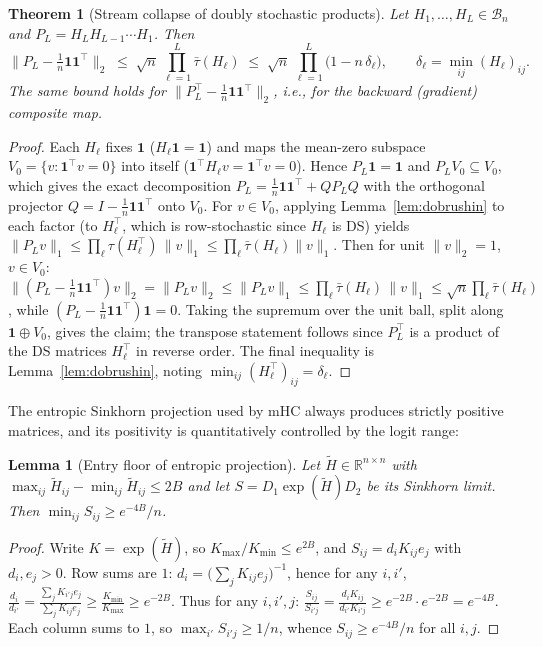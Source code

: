 \documentclass[11pt]{article}
\newtheorem{theorem}{Theorem}
\newtheorem{lemma}{Lemma}
\newcommand{\R}{\mathbb{R}}
\newcommand{\ones}{\mathbf{1}}
\newcommand{\J}{\tfrac{1}{n}\ones\ones^{\!\top}}
\begin{document}
\begin{theorem}[Stream collapse of doubly stochastic products]
\label{thm:collapse}
Let $H_1,\dots,H_L\in\mathcal{B}_n$ and $P_L=H_L H_{L-1}\cdots H_1$. Then
\begin{equation}
\Big\|P_L-\J\Big\|_2\;\le\;\sqrt{n}\,\prod_{\ell=1}^{L}\bar\tau(H_\ell)\;\le\;\sqrt{n}\,\prod_{\ell=1}^{L}\big(1-n\,\delta_\ell\big),
\qquad \delta_\ell=\min_{ij}(H_\ell)_{ij}.
\end{equation}
The same bound holds for $\|P_L^{\!\top}-\J\|_2$, i.e., for the backward (gradient) composite map.
\end{theorem}
\begin{proof}
Each $H_\ell$ fixes $\ones$ ($H_\ell\ones=\ones$) and maps the mean-zero subspace $V_0=\{v:\ones^{\!\top}v=0\}$ into itself ($\ones^{\!\top}H_\ell v=\ones^{\!\top}v=0$). Hence $P_L\ones=\ones$ and $P_L V_0\subseteq V_0$, which gives the exact decomposition $P_L=\J+Q P_L Q$ with the orthogonal projector $Q=I-\J$ onto $V_0$. For $v\in V_0$, applying Lemma~\ref{lem:dobrushin} to each factor (to $H_\ell^{\!\top}$, which is row-stochastic since $H_\ell$ is DS) yields
$\|P_Lv\|_1\le\prod_\ell\tau(H_\ell^{\!\top})\,\|v\|_1\le\prod_\ell\bar\tau(H_\ell)\|v\|_1$.
Then for unit $\|v\|_2=1$, $v\in V_0$:
$\|(P_L-\J)v\|_2=\|P_Lv\|_2\le\|P_Lv\|_1\le\prod_\ell\bar\tau(H_\ell)\,\|v\|_1\le\sqrt{n}\prod_\ell\bar\tau(H_\ell)$,
while $(P_L-\J)\ones=0$. Taking the supremum over the unit ball, split along $\ones\oplus V_0$, gives the claim; the transpose statement follows since $P_L^{\!\top}$ is a product of the DS matrices $H_\ell^{\!\top}$ in reverse order. The final inequality is Lemma~\ref{lem:dobrushin}, noting $\min_{ij}(H_\ell^{\!\top})_{ij}=\delta_\ell$.
\end{proof}

The entropic Sinkhorn projection used by mHC always produces strictly positive matrices, and its positivity is quantitatively controlled by the logit range:

\begin{lemma}[Entry floor of entropic projection]
\label{lem:floor}
Let $\tilde H\in\R^{n\times n}$ with $\max_{ij}\tilde H_{ij}-\min_{ij}\tilde H_{ij}\le 2B$ and let $S=D_1\exp(\tilde H)D_2$ be its Sinkhorn limit. Then $\min_{ij}S_{ij}\ge e^{-4B}/n$.
\end{lemma}
\begin{proof}
Write $K=\exp(\tilde H)$, so $K_{\max}/K_{\min}\le e^{2B}$, and $S_{ij}=d_i K_{ij}e_j$ with $d_i,e_j>0$. Row sums are $1$: $d_i=\big(\sum_j K_{ij}e_j\big)^{-1}$, hence for any $i,i'$,
$\frac{d_i}{d_{i'}}=\frac{\sum_j K_{i'j}e_j}{\sum_j K_{ij}e_j}\ge\frac{K_{\min}}{K_{\max}}\ge e^{-2B}$.
Thus for any $i,i',j$: $\frac{S_{ij}}{S_{i'j}}=\frac{d_iK_{ij}}{d_{i'}K_{i'j}}\ge e^{-2B}\cdot e^{-2B}=e^{-4B}$. Each column sums to $1$, so $\max_{i'}S_{i'j}\ge1/n$, whence $S_{ij}\ge e^{-4B}/n$ for all $i,j$.
\end{proof}
\end{document}
